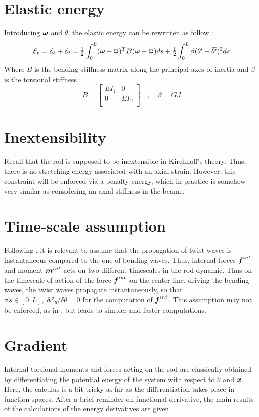 \section{Elastic energy}
Introducing $\boldsymbol{\omega}$ and $\theta$, the elastic energy can be rewritten as follow :
\begin{equation}
		\mathcal{E}_{p} = \mathcal{E}_{b} + \mathcal{E}_{t} = 
		\tfrac{1}{2} \int_{0}^{L} (\vect{\omega}-\overbar{\vect{\omega}})^T B (\vect{\omega}-\overbar{\vect{\omega}}) ds
		+ \tfrac{1}{2} \int_{0}^{L} \beta(\theta' -{\overbar{\theta'}})^2 ds
\end{equation}
Where $B$ is the bending stiffness matrix along the principal axes of inertia and $\beta$ is the torsional stiffness :
\begin{equation}
	B = \begin{bmatrix}
			EI_1	&	0\\
			0	&	EI_2\\
		\end{bmatrix}
	\quad,\quad
	\beta = GJ
\end{equation}

\section{Inextensibility}
Recall that the rod is supposed to be inextensible in Kirchhoff’s theory. Thus, there is no stretching energy associated with an axial strain. However, this constraint will be enforced via a penalty energy, which in practice is somehow very similar as considering an axial stiffness in the beam…

\section{Time-scale assumption}
Following \cite{Bergou2008}, it is relevant to assume that the propagation of twist waves is instantaneous compared to the one of bending waves. Thus, internal forces $\boldsymbol{f}^{int}$ and moment $\boldsymbol{m}^{int}$ acts on two different timescales in the rod dynamic. Thus on the timescale of action of the force $\boldsymbol{f}^{int}$ on the center line, driving the bending waves, the twist waves propagate instantaneously, so that $\forall s \in [0,L],\; \delta\mathcal{E}_{p}/\delta\theta=0$ for the computation of $\boldsymbol{f}^{int}$. This assumption may not be enforced, as in \cite{Nabei2014}, but leads to simpler and faster computations.

\section{Gradient}
Internal torsional moments and forces acting on the rod are classically obtained by differentiating the potential energy of the system with respect to $\theta$ and $\boldsymbol{x}$. Here, the calculus is a bit tricky as far as the differentiation takes place in function spaces. After a brief reminder on functional derivative, the main results of the calculations of the energy derivatives are given.

